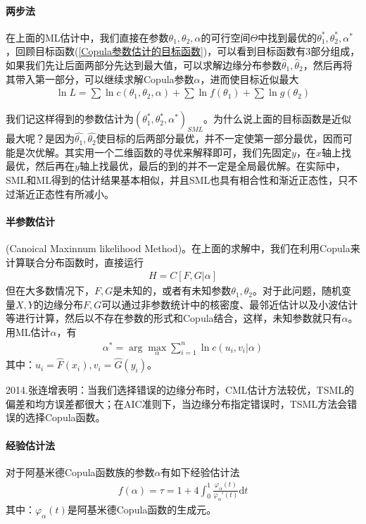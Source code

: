             \paragraph{两步法}在上面的ML估计中，我们直接在参数$\theta_1,\theta_2,\alpha$的可行空间$\Theta$中找到最优的$\theta_1^*,\theta_2^*,\alpha^*$，回顾目标函数(\ref{Copula参数估计的目标函数})，可以看到目标函数有3部分组成，如果我们先让后面两部分先达到最大值，可以求解边缘分布参数$\hat{\theta}_1,\hat{\theta}_2$，然后再将其带入第一部分，可以继续求解Copula参数$\alpha$，进而使目标近似最大
            \begin{align*}
            \ln L = \sum \ln c(\theta_1,\theta_2,\alpha) + \sum \ln f(\theta_1) + \sum \ln g(\theta_2)
            \end{align*}
            \par
            我们记这样得到的参数估计为$(\theta_1^*,\theta_2^*,\alpha^*)_{SML}$。为什么说上面的目标函数是近似最大呢？是因为$\hat{\theta_1},\hat{\theta_2}$使目标的后两部分最优，并不一定使第一部分最优，因而可能是次优解。其实用一个二维函数的寻优来解释即可，我们先固定$y$，在$x$轴上找最优，然后再在$y$轴上找最优，最后的到的并不一定是全局最优解。在实际中，SML和ML得到的估计结果基本相似，并且SML也具有相合性和渐近正态性，只不过渐近正态性有所减小。
            \paragraph{半参数估计}(Canoical Maxinnum likelihood Method)。在上面的求解中，我们在利用Copula来计算联合分布函数时，直接运行
            \begin{align*}
            H = C[F,G|\alpha]
            \end{align*}
            但在大多数情况下，$F,G$是未知的，或者有未知参数$\theta_1,\theta_2$。对于此问题，随机变量$X,Y$的边缘分布$F,G$可以通过非参数统计中的核密度、最邻近估计以及小波估计等进行计算，然后以不存在参数的形式和Copula结合，这样，未知参数就只有$\alpha$。用ML估计$\alpha$，有
            \begin{align*}
            \alpha^* = \arg \max_{\alpha} \sum_{i=1}^n \ln c(u_i,v_i|\alpha)
            \end{align*}
            其中：$u_i = \hat{F}(x_i),v_i = \hat{G}(y_i)$。
            \par
            2014.张连增\cite{Zhang.2014}表明：当我们选择错误的边缘分布时，CML估计方法较优，TSML的偏差和均方误差都很大；在AIC准则下，当边缘分布指定错误时，TSML方法会错误的选择Copula函数。
            \paragraph{经验估计法}对于阿基米德Copula函数族的参数$\alpha$有如下经验估计法
            \begin{align*}
            f(\alpha) = \tau =1+4\int_0^1 \frac{\varphi_\alpha(t)}{\varphi_\alpha'(t)}\mathrm{d}t
            \end{align*}
            其中：$\varphi_\alpha(t)$是阿基米德Copula函数的生成元。

